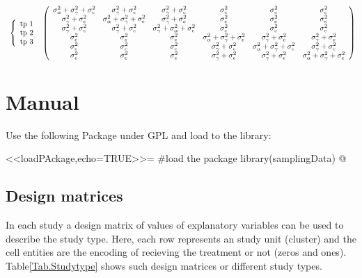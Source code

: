 \documentclass{article}
\begin{document}
\begin{tiny}
\begin{eqnarray*}
\begin{array}{c}
	\left\{
	\begin{array}{c}  
		\textrm{tp 1} 	\cr
 		\textrm{tp 2} \cr
		\textrm{tp 3}	\cr
 	\end{array}\right.	\cr
 \end{array}
 \left(
  \begin{array}{cccccc}
\sigma_{\alpha}^2 + \sigma_{\gamma}^2+ \sigma_{e}^2	&\sigma_{\gamma}^2 +\sigma_{e}^2 &  \sigma_{\gamma}^2 +\sigma_{e}^2
				&\sigma_{e}^2	&\sigma_{e}^2							&  \sigma_{e}^2\cr
\sigma_{\gamma}^2 +\sigma_{e}^2 						&  \sigma_{\alpha}^2 + \sigma_{\gamma}^2 + \sigma_{e}^2 	& \sigma_{\gamma}^2 +\sigma_{e}^2 
 				&\sigma_{e}^2	&\sigma_{e}^2							&  \sigma_{e}^2\cr
\sigma_{\gamma}^2 +\sigma_{e}^2 						&	\sigma_{\gamma}^2 +\sigma_{e}^2						&\sigma_{\gamma}^2 + \sigma_{\alpha}^2 +  \sigma_{e}^2
				&\sigma_{e}^2	&\sigma_{e}^2							&  \sigma_{e}^2\cr
\sigma_{e}^2	&\sigma_{e}^2							&  \sigma_{e}^2
				&\sigma_{\alpha}^2 + \sigma_{\gamma}^2 +\sigma_{e}^2	&\sigma_{\gamma}^2 +\sigma_{e}^2							&  \sigma_{\gamma}^2 +\sigma_{e}^2\cr
\sigma_{e}^2	&\sigma_{e}^2							&  \sigma_{e}^2
 				&\sigma_{\gamma}^2 +\sigma_{e}^2 						&  \sigma_{\alpha}^2 +  \sigma_{\gamma}^2 +\sigma_{e}^2 	& \sigma_{\gamma}^2 +\sigma_{e}^2 \cr
\sigma_{e}^2	&\sigma_{e}^2							&  \sigma_{e}^2
				&\sigma_{\gamma}^2 +\sigma_{e}^2 						&	\sigma_{\gamma}^2 +\sigma_{e}^2						& \sigma_{\alpha}^2 +  \sigma_{\gamma}^2 +\sigma_{e}^2\cr 
	\end{array}
	\right)\cr
\end{eqnarray*}
\end{tiny}


\section{Manual}

Use the following Package under GPL and load to the library:

<<loadPAckage,echo=TRUE>>=
#load the package
library(samplingData)
@


\subsection{Design matrices}

In each study a design matrix of values of explanatory variables can be used to describe the study type. 
Here, each row represents an study unit (cluster) and the cell entities are the encoding of recieving the treatment or not (zeros and ones). 
Table\ref{Tab.Studytype} shows such design matrices or different study types. 
\end{document}
